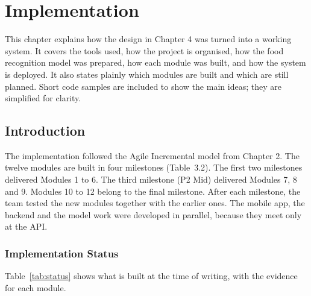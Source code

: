 \chapter{Implementation}

This chapter explains how the design in Chapter 4 was turned into a working system. It covers the tools
used, how the project is organised, how the food recognition model was prepared, how each module was
built, and how the system is deployed. It also states plainly which modules are built and which are still
planned. Short code samples are included to show the main ideas; they are simplified for clarity.

\section{Introduction}
The implementation followed the Agile Incremental model from Chapter 2. The twelve modules are built in
four milestones (Table~3.2). The first two milestones delivered Modules 1 to 6. The third milestone (P2 Mid)
delivered Modules 7, 8 and 9. Modules 10 to 12 belong to the final milestone. After each milestone, the team
tested the new modules together with the earlier ones. The mobile app, the backend and the model work were
developed in parallel, because they meet only at the API.

\subsection{Implementation Status}
Table~\ref{tab:status} shows what is built at the time of writing, with the evidence for each module.

